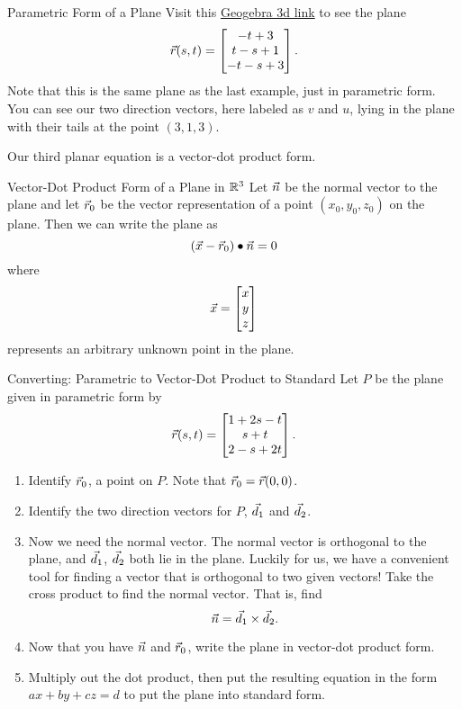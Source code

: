 \begin{example}{Parametric Form of a Plane}
Visit this \href{https://www.geogebra.org/3d/mzzqwynt}{Geogebra 3d link} to see the plane $$\vec{r}(s,t)=\begin{bmatrix}-t+3\\t-s+1\\-t-s+3\end{bmatrix}.$$ Note that this is the same plane as the last example, just in parametric form. You can see our two direction vectors, here labeled as $v$ and $u$, lying in the plane with their tails at the point $(3,1,3)$.
\end{example}

Our third planar equation is a vector-dot product form.

\begin{definition}{Vector-Dot Product Form of a Plane in $\mathbb{R}^3$}
Let $\vec{n}$ be the normal vector to the plane and let $\vec{r}_0$ be the vector representation of a point $(x_0,y_0,z_0)$ on the plane. Then we can write the plane as $$(\vec{x}-\vec{r}_0)\bullet\vec{n}=0 $$
where $$\vec{x}=\begin{bmatrix}x\\y\\z\end{bmatrix} $$ represents an arbitrary unknown point in the plane.
\end{definition}

\begin{exercise}{Converting: Parametric to Vector-Dot Product to Standard}
Let $P$ be the plane given in parametric form by
$$\vec{r}(s,t)=\begin{bmatrix}1+2s-t\\s+t\\2-s+2t\end{bmatrix}. $$
\begin{enumerate}
\item Identify $\vec{r}_0$, a point on $P$. Note that $\vec{r}_0=\vec{r}(0,0)$.
\vspace{1em}
\item Identify the two direction vectors for $P$, $\vec{d}_1$ and $\vec{d}_2$.
\vspace{1em}
\item Now we need the normal vector. The normal vector is orthogonal to the plane, and $\vec{d}_1$, $\vec{d}_2$ both lie in the plane. Luckily for us, we have a convenient tool for finding a vector that is orthogonal to two given vectors! Take the cross product to find the normal vector. That is, find $$\vec{n}=\vec{d}_1\times\vec{d}_2.$$
\item Now that you have $\vec{n}$ and $\vec{r}_0$, write the plane in vector-dot product form.
\vspace{1em}
\item Multiply out the dot product, then put the resulting equation in the form $ax+by+cz=d$ to put the plane into standard form.
\end{enumerate}
\end{exercise}

